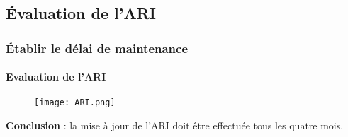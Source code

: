 \documentclass{beamer}
\begin{document}

\begin{frame}
\subsection{Évaluation de l'ARI }
\frametitle{Établir le délai de maintenance}
	\framesubtitle{Evaluation de l'ARI}

\begin{figure}
    \centering
    \texttt{[image: ARI.png]}
\end{figure}

\textbf{Conclusion} : la mise à jour de l'ARI doit être effectuée tous les quatre mois. 
\end{frame}

\end{document}

